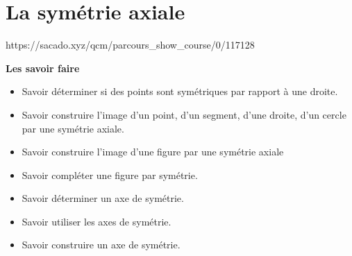 \chapter{La symétrie axiale}
{https://sacado.xyz/qcm/parcours_show_course/0/117128}
{
\begin{CpsCol}
\textbf{Les savoir faire}
\begin{itemize}
\item Savoir déterminer si des points sont symétriques par rapport à une droite.
\item Savoir construire l'image d'un point, d'un segment, d'une droite, d'un cercle par une symétrie axiale.
\item Savoir construire l'image d'une figure par une symétrie axiale
\item Savoir compléter une figure par symétrie.
\item Savoir déterminer un axe de symétrie.
\item Savoir utiliser les axes de symétrie.
\item Savoir construire un axe de symétrie.
\end{itemize}
\end{CpsCol}
}




